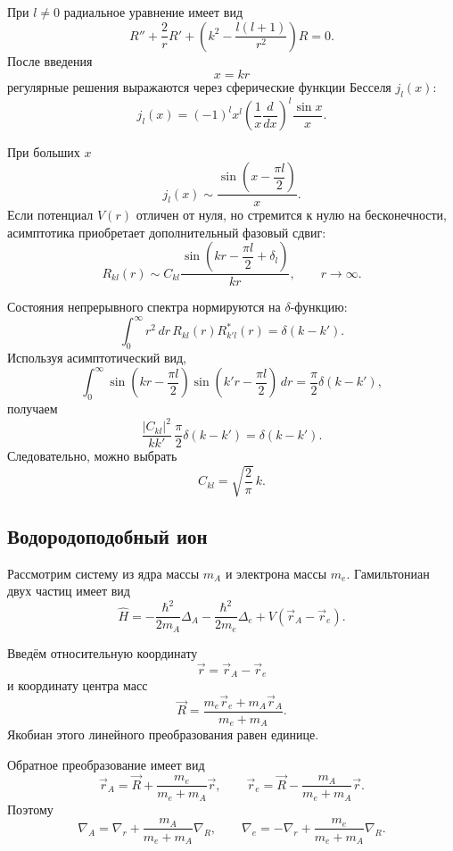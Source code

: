 \documentclass[12pt,a4paper]{article}
\begin{document}
При $l\neq0$ радиальное уравнение имеет вид
\[
    R''+\frac{2}{r}R'
    +
    \left(
        k^2-\frac{l(l+1)}{r^2}
    \right)R
    =
    0.
\]
После введения
\[
    x=kr
\]
регулярные решения выражаются через сферические функции Бесселя
$j_l(x)$:
\[
    \boxed{
    j_l(x)
    =
    (-1)^l x^l
    \left(
        \frac{1}{x}\frac{d}{dx}
    \right)^l
    \frac{\sin x}{x}
    }.
\]

При больших $x$
\[
    \boxed{
        j_l(x)
        \sim
        \frac{
            \sin\left(x-\dfrac{\pi l}{2}\right)
        }{x}
    }.
\]
Если потенциал $V(r)$ отличен от нуля, но стремится к нулю на
бесконечности, асимптотика приобретает дополнительный фазовый сдвиг:
\[
    \boxed{
        R_{kl}(r)
        \sim
        C_{kl}
        \frac{
            \sin\left(
                kr-\dfrac{\pi l}{2}+\delta_l
            \right)
        }{kr}
    },
    \qquad
    r\to\infty.
\]

Состояния непрерывного спектра нормируются на $\delta$-функцию:
\[
    \boxed{
    \int_0^\infty
        r^2\,dr\,
        R_{kl}(r)R_{k'l}^*(r)
    =
    \delta(k-k')
    }.
\]
Используя асимптотический вид,
\[
    \int_0^\infty
    \sin\left(kr-\frac{\pi l}{2}\right)
    \sin\left(k'r-\frac{\pi l}{2}\right)\,dr
    =
    \frac{\pi}{2}\delta(k-k'),
\]
получаем
\[
    \frac{|C_{kl}|^2}{kk'}\,
    \frac{\pi}{2}\delta(k-k')
    =
    \delta(k-k').
\]
Следовательно, можно выбрать
\[
    \boxed{
        C_{kl}
        =
        \sqrt{\frac{2}{\pi}}\,k
    }.
\]


\subsection{Водородоподобный ион}

Рассмотрим систему из ядра массы $m_A$ и электрона массы $m_e$.
Гамильтониан двух частиц имеет вид
\[
    \boxed{
    \hat H
    =
    -\frac{\hbar^2}{2m_A}\Delta_A
    -
    \frac{\hbar^2}{2m_e}\Delta_e
    +
    V(\vec r_A-\vec r_e)
    }.
\]

Введём относительную координату
\[
    \boxed{
        \vec r=\vec r_A-\vec r_e
    }
\]
и координату центра масс
\[
    \boxed{
        \vec R
        =
        \frac{
            m_e\vec r_e+m_A\vec r_A
        }{
            m_e+m_A
        }
    }.
\]
Якобиан этого линейного преобразования равен единице.

Обратное преобразование имеет вид
\[
    \vec r_A
    =
    \vec R+
    \frac{m_e}{m_e+m_A}\vec r,
    \qquad
    \vec r_e
    =
    \vec R-
    \frac{m_A}{m_e+m_A}\vec r.
\]
Поэтому
\[
    \nabla_A
    =
    \nabla_r+
    \frac{m_A}{m_e+m_A}\nabla_R,
    \qquad
    \nabla_e
    =
    -\nabla_r+
    \frac{m_e}{m_e+m_A}\nabla_R.
\]
\end{document}
